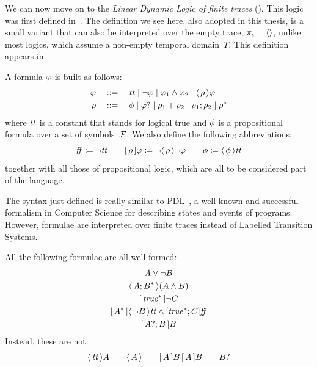We can now move on to the \emph{Linear Dynamic Logic of finite traces}
(\ldl{}).  This logic was first defined in~\cite{bib:ltlf-ldlf}. The
definition we see here, also adopted in this thesis, is a small variant that
can also be interpreted over the empty trace, $\pi_\epsilon = \langle
\rangle$, unlike most logics, which assume a non-empty temporal domain~$T$.
This definition appears in~\cite{bib:degiacomo-logic-nmrdp}.

\begin{definition}
	A \ldl{} formula $\varphi$ is built as follows:
	\begin{equation}
	\begin{aligned}
		\varphi \quad &::= \quad \text{\textit{tt}} \mid \neg \varphi \mid \varphi_1 \land
			\varphi_2 \mid \langle\, {\rho} \,\rangle \varphi \\
		\rho \quad &::= \quad \phi \mid \varphi? \mid \rho_1 +
			\rho_2 \mid \rho_1; \rho_2 \mid \rho^* \\
	\end{aligned}
	\label{eq:ldl-syntax}
	\end{equation}
	where $\text{\textit{tt}}$ is a constant that stands for logical true and $\phi$
	is a propositional formula over a set of symbols~$\mathcal{F}$. We also define
	the following abbreviations:
	\[
		\text{\textit{ff}} \coloneqq \neg \text{\textit{tt}} \qquad
		[\, {\rho} \,]\varphi \coloneqq \neg \langle\, {\rho} \,\rangle\neg \varphi
		\qquad \phi \coloneqq \langle\, {\phi} \,\rangle \text{\textit{tt}}
	\]
	together with all those of propositional logic, which are all to be
	considered part of the language.
	\label{def:ldlf-syntax}
\end{definition}

The syntax just defined is really similar to PDL~\cite{bib:pdl}, a well known
and successful formalism in Computer Science for describing states and events
of programs. However, \ldl{} formulae are interpreted over finite traces
instead of Labelled Transition Systems.

\begin{example}
	All the following formulae are all well-formed:
	\begin{gather*}
		A \lor \lnot B \\
		\ldiamond{A; B^*} (A \land B) \\
		\lbox{\true^*} \lnot C \\
		\lbox{A^*}\ldiamond{\lnot B}\ltt \land [\true^*; C]\lff \\
		\lbox{A?; B}B
	\end{gather*}
	Instead, these are not:
	\[
		\langle\, {\text{\textit{tt}}} \,\rangle A \qquad \langle\, {A} \,\rangle \qquad [\, {A} \,] B \, [\, {A} \,] B
		\qquad B?
	\]
\end{example}

